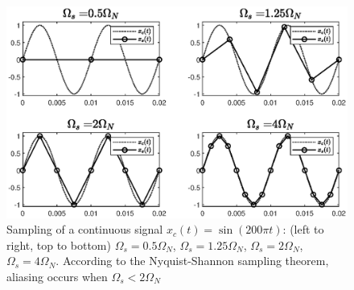 \begin{figure}[H]
    \centering
    \includegraphics[width=\textwidth, center]{images/nyquist.eps}
    \caption{Sampling of a continuous signal $x_{c}(t)=\sin(200\pi t)$: (left to right, top to bottom) $\Omega_{s}=0.5\Omega_{N}$, $\Omega_{s}=1.25\Omega_{N}$, $\Omega_{s}=2\Omega_{N}$, $\Omega_{s}=4\Omega_{N}$. According to the Nyquist-Shannon sampling theorem, aliasing occurs when $\Omega_{s} < 2\Omega_{N}$}
    \label{fig:nyquist}
\end{figure}

